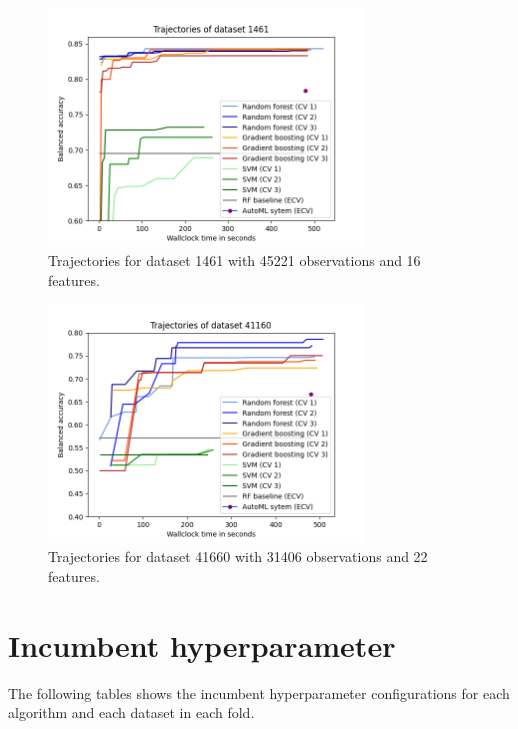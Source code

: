\documentclass[11pt]{article}
\begin{document}
\begin{figure}[H]
 \centering
  \includegraphics[width=0.75\textwidth]{fig/plot_dataset_1461.png}
  \caption{Trajectories for dataset 1461 with 45221 observations and 16 features.}
\end{figure}

\begin{figure}[H]
 \centering
  \includegraphics[width=0.75\textwidth]{fig/plot_dataset_41160.png}
  \caption{Trajectories for dataset 41660 with 31406 observations and 22 features.}
\end{figure}

\section{Incumbent hyperparameter}

The following tables shows the incumbent hyperparameter configurations for each algorithm and each dataset in each fold. 
\end{document}
